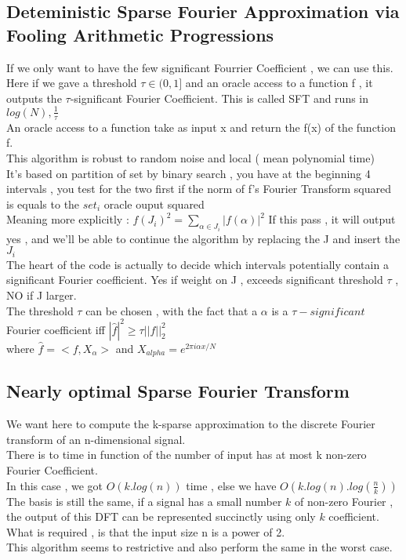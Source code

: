 \documentclass{article}
\begin{document}
\subsection{Deteministic Sparse Fourier Approximation via Fooling Arithmetic Progressions}
If we only want to have the few significant Fourrier Coefficient , we can use this.\\
Here if we gave a threshold $\tau \in (0,1]$ and an oracle access to a function f , it outputs the $\tau$-significant Fourier Coefficient. This is called SFT and runs in $log(N) ,\frac{1}{\tau}$\\
An oracle access to a function take as input x and return the f(x) of the function f.\\
This algorithm is robust to random noise and local ( mean polynomial time)\\
It's based on partition of set by binary search , you have at the beginning 4 intervals , you test for the two first if the norm of f's Fourier Transform squared is equals to the $set_i$ oracle ouput squared\\
Meaning more explicitly : $f(J_i)^2 = \sum_{\alpha \in J_i}{|f(\alpha)|^2}$ If this pass , it will output yes , and we'll be able to continue the algorithm by replacing the J and insert the $J_i$\\
The heart of the code is actually to decide which intervals potentially contain a significant Fourier coefficient. Yes if weight on J , exceeds significant threshold $\tau$ , NO if J larger.\\
The threshold $\tau$ can be chosen , with the fact that a $\alpha$ is a $\tau -significant$ Fourier coefficient iff $|\hat{f}|^2 \geq \tau||f||^{2}_2$\\ where $\hat{f} = <f,X_{\alpha}>$ and $X_{alpha} = e^{2\pi i \alpha x/N}$

\subsection{Nearly optimal Sparse Fourier Transform}
We want here to compute the k-sparse approximation to the discrete Fourier transform of an n-dimensional signal.\\
There is to time in function of the number of input has at most k non-zero Fourier Coefficient.\\
In this case , we got $O(k.log(n))$ time , else we have $O(k.log(n).log(\frac{n}{k}))$\\
The basis is still the same, if a signal has a small number $k$ of non-zero Fourier , the output of this DFT can be represented succinctly using only $k$ coefficient.\\
What is required , is that the input size n is a power of 2.\\
This algorithm seems to restrictive and also perform the same in the worst case.\\
\end{document}
